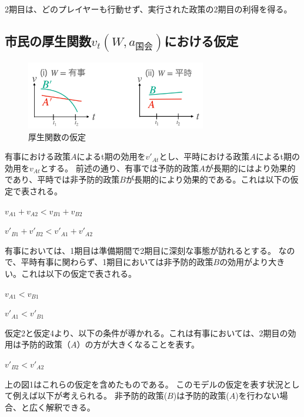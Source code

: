 \documentclass[main.tex]{subfiles}
\begin{document}
2期目は、どのプレイヤーも行動せず、実行された政策の2期目の利得を得る。




\subsection{市民の厚生関数$v_t(W, a_{国会})$における仮定}

\begin{figure}[htbp]
  \centering
  \includegraphics[width=0.7\textwidth]{./image/assumption_welfare_policy.png}
  \caption{厚生関数の仮定} 
  \label{fig:assumption_welfare_policy}
\end{figure}

有事における政策$A$によるt期の効用を$v'_{At}$とし、平時における政策$A$によるt期の効用を$v_{At}$とする。
前述の通り、有事では予防的政策$A$が長期的にはより効果的であり、平時では非予防的政策$B$が長期的により効果的である。これは以下の仮定で表される。
\begin{assumption}  $v_{A1} + v_{A2} < v_{B1} + v_{B2}$ \end{assumption}
\begin{assumption}  $v'_{B1} + v'_{B2} < v'_{A1} + v'_{A2}$ \end{assumption}


有事においては、1期目は準備期間で2期目に深刻な事態が訪れるとする。
なので、平時有事に関わらず、1期目においては非予防的政策$B$の効用がより大きい。これは以下の仮定で表される。
\begin{assumption}  $v_{A1} < v_{B1}$  \end{assumption}
\begin{assumption}  $v'_{A1} < v'_{B1}$ \end{assumption}

仮定2と仮定4より、以下の条件が導かれる。これは有事においては、2期目の効用は予防的政策（$A$）の方が大きくなることを表す。
\begin{condition}  $v'_{B2} < v'_{A2}$ \end{condition}


上の図1はこれらの仮定を含めたものである。
このモデルの仮定を表す状況として例えば以下が考えられる。
非予防的政策($B$)は予防的政策($A$)を行わない場合、と広く解釈できる。
\end{document}
